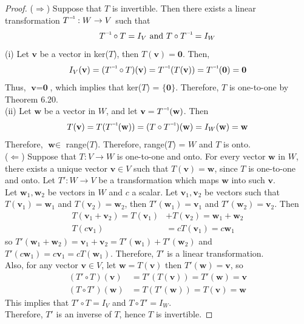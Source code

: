 \begin{proof}
	($\Rightarrow$) Suppose that $T$ is invertible. Then there exists a linear transformation $\inv{T}: W \rightarrow V$ such that \begin{equation*}
		\inv{T} \circ T = I_V \mbox{ and } T \circ \inv{T} = I_W
	\end{equation*}
	(i) Let $\textbf{v}$ be a vector in ker($T$), then $T(\textbf{v}) = \textbf{0}$. Then, \begin{equation*}
		I_V(\textbf{v}) = (\inv{T} \circ T)(\textbf{v}) = \inv{T}(T(\textbf{v})) = \inv{T}(\textbf{0}) = \textbf{0}
	\end{equation*} Thus, $\textbf{v} = \textbf{0}$, which implies that ker($T$) = $\{\textbf{0}\}$. Therefore, $T$ is one-to-one by Theorem 6.20. \\
	
	(ii) Let $\textbf{w}$ be a vector in $W$, and let $\textbf{v} = \inv{T}(\textbf{w})$. Then \begin{equation*}
		T(\textbf{v}) = T(\inv{T}(\textbf{w})) = (T \circ \inv{T})(\textbf{w}) = I_W(\textbf{w}) = \textbf{w}
	\end{equation*} Therefore, $\textbf{w} \in $ range($T$). Therefore, range($T$) = $W$ and $T$ is onto. \\
	
	($\Leftarrow$) Suppose that $T: V \rightarrow W$ is one-to-one and onto. For every vector $\textbf{w}$ in $W$, there exists a unique vector $\textbf{v} \in V$ such that $T(\textbf{v}) = \textbf{w}$, since $T$ is one-to-one and onto. Let $T': W \rightarrow V$ be a transformation which maps $\textbf{w}$ into such $\textbf{v}$. \\
	
	Let $\textbf{w}_1, \textbf{w}_2$ be vectors in $W$ and $c$ a scalar. Let $\textbf{v}_1, \textbf{v}_2$ be vectors such that $T(\textbf{v}_1) = \textbf{w}_1$ and $T(\textbf{v}_2) = \textbf{w}_2$, then $T'(\textbf{w}_1) = \textbf{v}_1$ and $T'(\textbf{w}_2) = \textbf{v}_2$. Then \begin{align*}
		T(\textbf{v}_1 + \textbf{v}_2) = T(\textbf{v}_1) &+ T(\textbf{v}_2) = \textbf{w}_1 + \textbf{w}_2 \\
		T(c\textbf{v}_1) &= cT(\textbf{v}_1) = c\textbf{w}_1
	\end{align*}
	so $T'(\textbf{w}_1 + \textbf{w}_2) = \textbf{v}_1 + \textbf{v}_2 = T'(\textbf{w}_1) + T'(\textbf{w}_2)$ and $T'(c\textbf{w}_1) = c\textbf{v}_1 = cT(\textbf{w}_1)$. Therefore, $T'$ is a linear transformation. \\
	
	Also, for any vector $\textbf{v} \in V$, let $\textbf{w} = T(\textbf{v})$ then $T'(\textbf{w}) = \textbf{v}$, so \begin{align*}
		(T' \circ T)(\textbf{v}) &= T'(T(\textbf{v})) = T'(\textbf{w}) = \textbf{v} \\
		(T \circ T')(\textbf{w}) &= T(T'(\textbf{w})) = T(\textbf{v}) = \textbf{w}
	\end{align*} This implies that $T' \circ T = I_V$ and $T \circ T' = I_W$. \\
	
	Therefore, $T'$ is an inverse of $T$, hence $T$ is invertible.
\end{proof}

